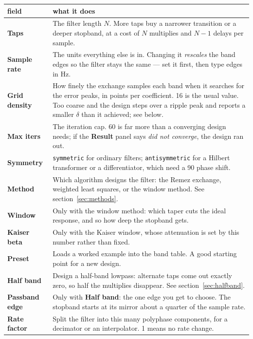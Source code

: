 \documentclass[11pt,a4paper]{article}
\newcommand{\ctl}[1]{\textbf{#1}}
\newcommand{\lit}[1]{\texttt{#1}}
\begin{document}
\begin{tabularx}{\textwidth}{@{}lY@{}}
  \toprule
  \textbf{field} & \textbf{what it does} \\
  \midrule
  \ctl{Taps} & The filter length $N$. More taps buy a narrower transition or a
    deeper stopband, at a cost of $N$ multiplies and $N-1$ delays per sample. \\
  \addlinespace
  \ctl{Sample rate} & The units everything else is in. Changing it
    \emph{rescales} the band edges so the filter stays the same --- set it
    first, then type edges in Hz. \\
  \addlinespace
  \ctl{Grid density} & How finely the exchange samples each band when it
    searches for the error peaks, in points per coefficient. 16 is the usual
    value. Too coarse and the design steps over a ripple peak and reports a
    smaller $\delta$ than it achieved; see below. \\
  \addlinespace
  \ctl{Max iters} & The iteration cap. 60 is far more than a converging design
    needs; if the \ctl{Result} panel says \emph{did not converge}, the design
    ran out. \\
  \addlinespace
  \ctl{Symmetry} & \lit{symmetric} for ordinary filters; \lit{antisymmetric}
    for a Hilbert transformer or a differentiator, which need a
    90\textdegree{} phase shift. \\
  \addlinespace
  \ctl{Method} & Which algorithm designs the filter: the Remez exchange,
    weighted least squares, or the window method. See
    section~\ref{sec:methods}. \\
  \addlinespace
  \ctl{Window} & Only with the window method: which taper cuts the ideal
    response, and so how deep the stopband gets. \\
  \addlinespace
  \ctl{Kaiser beta} & Only with the Kaiser window, whose attenuation is set by
    this number rather than fixed. \\
  \addlinespace
  \ctl{Preset} & Loads a worked example into the band table. A good starting
    point for a new design. \\
  \addlinespace
  \ctl{Half band} & Design a half-band lowpass: alternate taps come out exactly
    zero, so half the multiplies disappear. See section~\ref{sec:halfband}. \\
  \addlinespace
  \ctl{Passband edge} & Only with \ctl{Half band}: the one edge you get to
    choose. The stopband starts at its mirror about a quarter of the sample
    rate. \\
  \addlinespace
  \ctl{Rate factor} & Split the filter into this many polyphase components, for
    a decimator or an interpolator. 1 means no rate change. \\
  \bottomrule
\end{tabularx}
\end{document}
